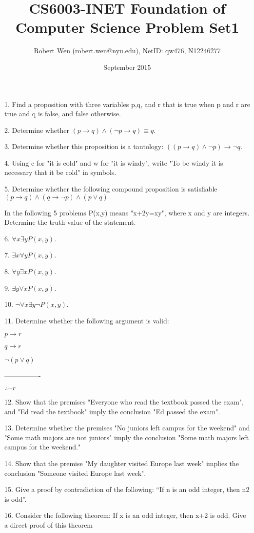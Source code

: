 \documentclass{article}
\title{CS6003-INET Foundation of Computer Science Problem Set1}
\author{Robert Wen (robert.wen@nyu.edu), NetID: qw476, N12246277}
\date{September 2015}
\begin{document}
\maketitle

1. Find a proposition with three variables p,q, and r that is true when p and r are true and q is false, and false otherwise.

2. Determine whether $(p \to q) \land (\lnot p \to q) \equiv q$.

3. Determine whether this proposition is a tautology: $((p \to q) \land \lnot p) \to \lnot q$.

4. Using c for "it is cold" and w for "it is windy", write "To be windy it is necessary that it be cold" in symbols.

5. Determine whether the following compound proposition is satisfiable $(p \to q) \land (q \to \lnot p)\land (p \lor q)$

In the following 5 problems P(x,y) means "x+2y=xy", where x and y are integers. Determine the truth value of the statement.

6. $\forall x \exists yP(x,y)$.

7. $\exists x \forall yP(x,y)$.

8. $\forall y \exists xP(x,y)$.

9. $\exists y \forall xP(x,y)$.

10. $\lnot \forall x \exists y \lnot P(x,y)$.

11. Determine whether the following argument is valid:

$p \to r$

$q \to r$

$\lnot (p \lor q)$

----------------

$\therefore \lnot r$

12. Show that the premises "Everyone who read the textbook passed the exam", and "Ed read the textbook" imply the conclusion "Ed passed the exam".

13. Determine whether the premises "No juniors left campus for the weekend" and "Some math majors are not juniors" imply the conclusion "Some math majors left campus for the weekend."

14. Show that the premise "My daughter visited Europe last week" implies the conclusion "Someone visited Europe last week".

15. Give a proof by contradiction of the following: “If n is an odd integer, then n2 is odd”.

16. Consider the following theorem: If x is an odd integer, then x+2 is odd. Give a direct proof of this theorem
\end{document}
